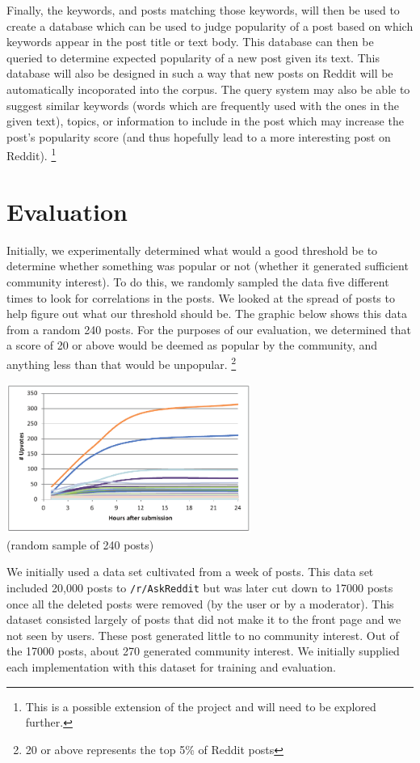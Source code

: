 \documentclass{acm_proc_article-sp}
\begin{document}
Finally, the keywords, and posts matching those keywords, will then be used to create a database which
can be used to judge popularity of a post based on which keywords appear in the post title or text
body.  This database can then be queried to determine expected popularity of a new post given its
text.  This database will also be designed in such a way that new posts on Reddit will be automatically
incoporated into the corpus.
The query system may also be able to suggest similar keywords (words which are frequently used with
the ones in the given text), topics, or information to include in the post which may increase
the post's popularity score (and thus hopefully lead to a more interesting post on Reddit).
\footnote{This is a possible extension of the project and will need to be explored further.}

\section{Evaluation}
Initially, we experimentally determined what would a good threshold be to determine whether something was popular or not (whether it generated sufficient community interest). To do this, we randomly sampled the data five different times to look for correlations in the posts. We looked at the spread of posts to help figure out what our threshold should be. The graphic below shows this data from a random 240 posts. For the purposes of our evaluation, we determined that a score of 20 or above would be deemed as popular by the community, and anything less than that would be unpopular. \footnote{20 or above represents the top 5\% of Reddit posts}

\includegraphics[width=8cm]{evaluation.pdf}\\
(random sample of 240 posts)

We initially used a data set cultivated from a week of posts. This data set included 20,000 posts to \texttt{/r/AskReddit} but was later cut down to 17000 posts once all the deleted posts were removed (by the user or by a moderator). This dataset consisted largely of posts that did not make it to the front page and we not seen by users. These post generated little to no community interest. Out of the 17000 posts, about 270 generated community interest. We initially supplied each implementation with this dataset for training and evaluation.
\end{document}
